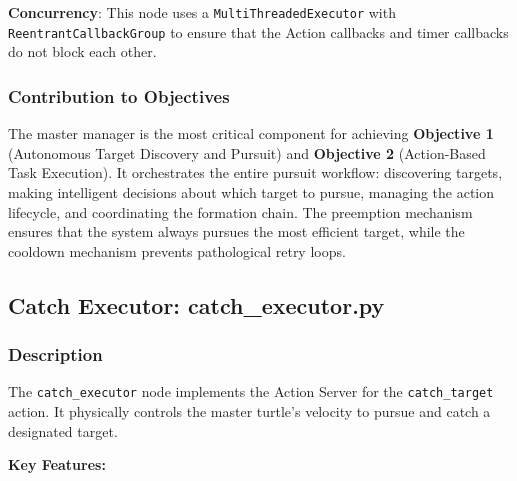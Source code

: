 \documentclass[12pt,a4paper]{article}
\begin{document}
\textbf{Concurrency}: This node uses a \texttt{MultiThreadedExecutor} with \texttt{ReentrantCallbackGroup} to ensure that the Action callbacks and timer callbacks do not block each other.

\subsubsection{Contribution to Objectives}

The master manager is the most critical component for achieving \textbf{Objective 1} (Autonomous Target Discovery and Pursuit) and \textbf{Objective 2} (Action-Based Task Execution). It orchestrates the entire pursuit workflow: discovering targets, making intelligent decisions about which target to pursue, managing the action lifecycle, and coordinating the formation chain. The preemption mechanism ensures that the system always pursues the most efficient target, while the cooldown mechanism prevents pathological retry loops.

\subsection{Catch Executor: catch\_executor.py}
\label{subsec:catch}

\subsubsection{Description}

The \texttt{catch\_executor} node implements the Action Server for the \texttt{catch\_target} action. It physically controls the master turtle's velocity to pursue and catch a designated target.

\textbf{Key Features:}
\end{document}
